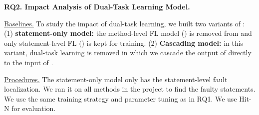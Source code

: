 
%
%





{\bf RQ2. Impact Analysis of Dual-Task Learning Model.}

\underline{Baselines.} To study the impact of dual-task learning, we built two variants of {\tool}: 
(1) \textbf{statement-only model:} the method-level FL model
() is removed from {\tool} and only statement-level FL
() is kept for training. (2) \textbf{Cascading model:} in
this variant, dual-task learning is removed in which we cascade the
output of  directly to the input of .



\underline{Procedures.}
The statement-only model only has the statement-level fault
localization. We ran it on all methods in the project to find the
faulty statements. We use the same training strategy and parameter
tuning as in RQ1.
We use Hit-N for evaluation.



